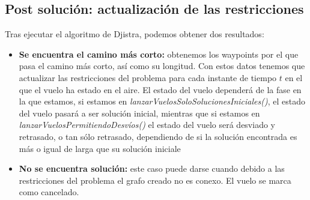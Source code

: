 \subsection{Post solución: actualización de las restricciones}
Tras ejecutar el algoritmo de Djistra, podemos obtener dos resultados:
\begin{itemize}
	\item \textbf{Se encuentra el camino más corto:} obtenemos los waypoints por el que pasa el camino más corto, así como su longitud. Con estos datos tenemos que actualizar las restricciones del problema para cada instante de tiempo $t$ en el que el vuelo ha estado en el aire. El estado del vuelo dependerá de la fase en la que estamos, si estamos en \textit{lanzarVuelosSoloSolucionesIniciales()}, el estado del vuelo pasará a ser solución inicial, mientras que si estamos en \textit{lanzarVuelosPermitiendoDesvíos()} el estado del vuelo será desviado y retrasado, o tan sólo retrasado, dependiendo de si la solución encontrada es más o igual de larga que su solución iniciale
	\item \textbf{No se encuentra solución:} este caso puede darse cuando debido a las restricciones del problema el grafo creado no es conexo. El vuelo se marca como cancelado.
\end{itemize}
